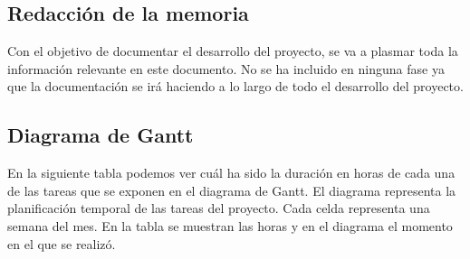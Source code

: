 \subsection{Redacción de la memoria}

Con el objetivo de documentar el desarrollo del proyecto, se va a plasmar toda la información relevante en este documento. No se ha incluido en ninguna fase ya que la documentación se irá haciendo a lo largo de todo el desarrollo del proyecto. 

\subsection{Diagrama de Gantt}

En la siguiente tabla podemos ver cuál ha sido la duración en horas de cada una de las tareas que se exponen en el diagrama de Gantt. El diagrama representa la planificación temporal de las tareas del proyecto. Cada celda representa una semana del mes. En la tabla se muestran las horas y en el diagrama el momento en el que se realizó. 

